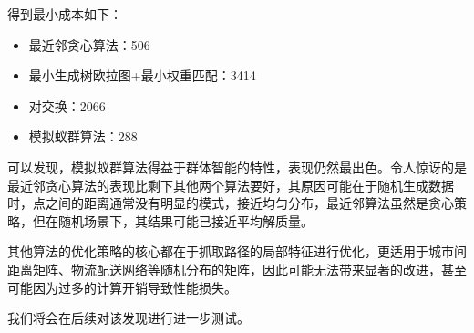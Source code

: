 得到最小成本如下：\begin{itemize}
    \item 最近邻贪心算法：506
    \item 最小生成树欧拉图+最小权重匹配：3414
    \item 对交换：2066
    \item 模拟蚁群算法：288
\end{itemize}

可以发现，模拟蚁群算法得益于群体智能的特性，表现仍然最出色。令人惊讶的是最近邻贪心算法的表现比剩下其他两个算法要好，其原因可能在于随机生成数据时，点之间的距离通常没有明显的模式，接近均匀分布，最近邻算法虽然是贪心策略，但在随机场景下，其结果可能已接近平均解质量。

其他算法的优化策略的核心都在于抓取路径的局部特征进行优化，更适用于城市间距离矩阵、物流配送网络等随机分布的矩阵，因此可能无法带来显著的改进，甚至可能因为过多的计算开销导致性能损失。

我们将会在后续对该发现进行进一步测试。

